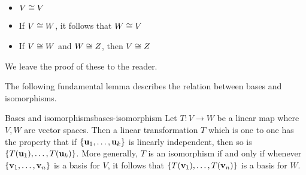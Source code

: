 \begin{itemize}
\item $V\cong V$

\item If $V\cong W$, it follows that $W\cong V$

\item If $V\cong W$ and $W\cong Z$, then $V\cong Z$
\end{itemize}

We leave the proof of these to the reader.

The following fundamental lemma describes the relation between bases and
isomorphisms.

\begin{lemma}{Bases and isomorphisms}{bases-isomorphism}
Let $T:V\rightarrow W$ be a
 linear map where $V,W$ are vector spaces.  Then a linear transformation $T$ which is one to one has the property that
if $\left\{\mbox{\bf u}_{1},\ldots,\mbox{\bf u}_{k}\right\} $ is linearly
independent, then so is $\left\{T(\mbox{\bf u}_{1}),\ldots,T(\mbox{\bf u}_{k})\right\}$.
 More generally, $T$ is an
isomorphism if and only if whenever $\left\{
\mbox{\bf v}_{1},\ldots,\mbox{\bf v}_{n}\right\} $ is a basis for $V$, it follows
that $\left\{T(\mbox{\bf v}_{1}),\ldots,T(\mbox{\bf v}_{n})\right\} $ is a basis for $W$.
\end{lemma}

